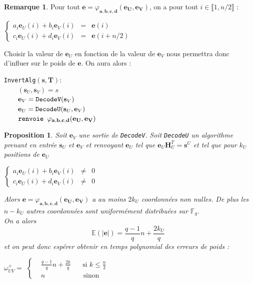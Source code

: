 \documentclass[12pt]{article}
\theoremstyle{plain}
\newtheorem{propo}[thm]{Proposition}
\theoremstyle{definition}
\newtheorem{remarque}[thm]{Remarque}
\newcommand{\F}{\mathbb{F}}
\begin{document}
\begin{remarque} Pour tout $\mathbf{e} = \varphi_{\mathbf{a},\mathbf{b},\mathbf{c},\mathbf{d}}(\mathbf{e_U},\mathbf{e_V})$, on a pour tout $i \in \llbracket 1,n/2\rrbracket$ :
\begin{center}

$\left \{
\begin{array}{rcl}
a_i\mathbf{e}_U(i) + b_i\mathbf{e}_V(i) &=& \mathbf{e}(i) \\
c_i\mathbf{e}_U(i) + d_i\mathbf{e}_V(i) &=& \mathbf{e}(i+n/2) 
\end{array}
\right.$
\end{center}

\noindent Choisir la valeur de $\mathbf{e}_U$ en fonction de la valeur de $\mathbf{e}_V$ nous permettra donc d'influer sur le poids de $\mathbf{e}$. On aura alors :

\begin{flushleft}
\leftskip=2cm
\verb|InvertAlg|$(\mathbf{s},\mathbf{T}) : $\\
$\qquad (\mathbf{s}_U, \mathbf{s}_V) = s $\\
$\qquad \mathbf{e}_V = \verb|DecodeV|(\mathbf{s}_V)$ \\
$\qquad \mathbf{e}_U = \verb|DecodeU|(\mathbf{s}_U, \mathbf{e}_V) $\\
$\qquad \verb|renvoie | \varphi_{\mathbf{a},\mathbf{b},\mathbf{c},\mathbf{d}}(\mathbf{e_U},\mathbf{e_V})$ \\
\leftskip=0cm
\vspace{0.1in}
\end{flushleft}

\end{remarque}

\begin{propo} \label{uv+} Soit $\mathbf{e}_V$ une sortie de \verb|DecodeV|. Soit \verb|DecodeU| un algorithme prenant en entrée $\mathbf{s}_U$ et $\mathbf{e}_V$ et renvoyant $\mathbf{e}_U$ tel que $\mathbf{e}_U\mathbf{H}_U^T = \mathbf{s}^U$ et tel que pour $k_U$ positions de $\mathbf{e}_U$ 
\begin{center}
$\left \{
\begin{array}{rcl}
a_i\mathbf{e}_U(i) + b_i\mathbf{e}_V(i) &\neq& 0 \\
c_i\mathbf{e}_U(i) + d_i\mathbf{e}_V(i) &\neq& 0
\end{array}
\right.$
\end{center}
Alors $\mathbf{e} = \varphi_{\mathbf{a},\mathbf{b},\mathbf{c},\mathbf{d}}(\mathbf{e_U},\mathbf{e_V})$ a au moins $2k_U$ coordonnées non nulles. De plus les $n-k_U$ autres coordonnées sont uniformément distribuées sur $\F_q$. \\
On a alors 
$$ \mathbb{E}(|\mathbf{e}|) = \frac{q-1}{q}n + \frac{2k_U}{q} $$
et on peut donc espérer obtenir en temps polynomial des erreurs de poids :
\begin{center}
$\omega^+_{UV} = $
$\left \{
\begin{array}{rcl}
&\frac{q-1}{q}n + \frac{2k}{q} & \;\; \text{ si } k \leq \frac{n}{2} \\
&n & \quad \text{sinon}
\end{array}
\right.$
\end{center}
\end{propo}
\end{document}
